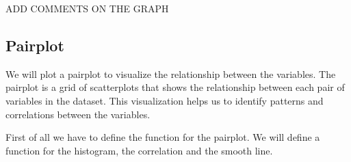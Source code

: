 \documentclass[
]{article}
\newenvironment{Shaded}{\begin{snugshade}}{\end{snugshade}}
\newcommand{\AttributeTok}[1]{\textcolor[rgb]{0.13,0.29,0.53}{#1}}
\newcommand{\CommentTok}[1]{\textcolor[rgb]{0.56,0.35,0.01}{\textit{#1}}}
\newcommand{\ConstantTok}[1]{\textcolor[rgb]{0.56,0.35,0.01}{#1}}
\newcommand{\ControlFlowTok}[1]{\textcolor[rgb]{0.13,0.29,0.53}{\textbf{#1}}}
\newcommand{\DecValTok}[1]{\textcolor[rgb]{0.00,0.00,0.81}{#1}}
\newcommand{\FloatTok}[1]{\textcolor[rgb]{0.00,0.00,0.81}{#1}}
\newcommand{\FunctionTok}[1]{\textcolor[rgb]{0.13,0.29,0.53}{\textbf{#1}}}
\newcommand{\NormalTok}[1]{#1}
\newcommand{\OtherTok}[1]{\textcolor[rgb]{0.56,0.35,0.01}{#1}}
\newcommand{\SpecialCharTok}[1]{\textcolor[rgb]{0.81,0.36,0.00}{\textbf{#1}}}
\newcommand{\StringTok}[1]{\textcolor[rgb]{0.31,0.60,0.02}{#1}}
\begin{document}
ADD COMMENTS ON THE GRAPH

\subsection{Pairplot}\label{pairplot}

We will plot a pairplot to visualize the relationship between the
variables. The pairplot is a grid of scatterplots that shows the
relationship between each pair of variables in the dataset. This
visualization helps us to identify patterns and correlations between the
variables.

First of all we have to define the function for the pairplot. We will
define a function for the histogram, the correlation and the smooth
line.

\begin{Shaded}
\end{Shaded}
\end{document}
